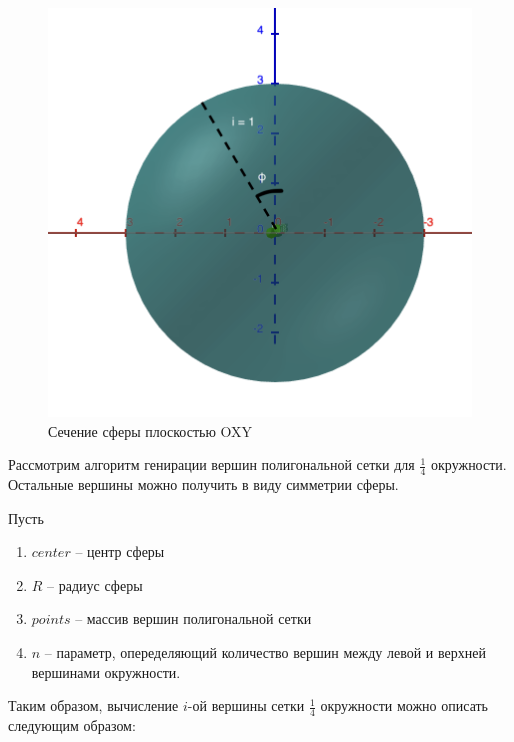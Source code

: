     \begin{figure}[h!]
    	\begin{center}
        \includegraphics[scale=0.6]{inc/pol_al.png}
        \caption{Сечение сферы плоскостью OXY}
        \label{pic:pol_alg}
        \end{center}
	\end{figure}
    \par Рассмотрим алгоритм генирации вершин полигональной сетки для \begin{math}\frac{1}{4}\end{math} окружности. Остальные вершины можно получить в виду симметрии сферы.
    \par Пусть 
    \begin{enumerate}
    	\item $center$ -- центр сферы
    	\item $R$ -- радиус сферы
    	\item $points$ -- массив вершин полигональной сетки
    	\item $n$ -- параметр, опеределяющий количество вершин между левой и верхней вершинами окружности.
    \end{enumerate}
    \par Таким образом, вычисление $i$-ой вершины сетки \begin{math}\frac{1}{4}\end{math} окружности можно описать следующим образом:
